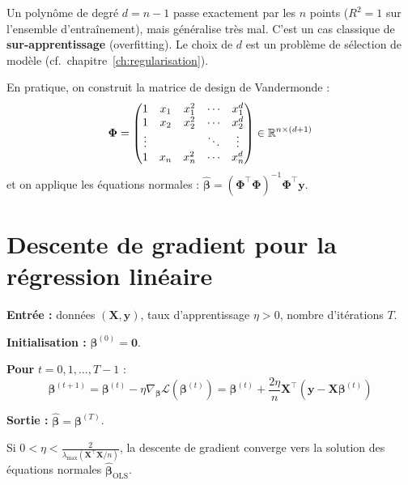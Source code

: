\begin{attention}[title=\textbf{Sur-apprentissage polynomial}]
Un polyn\^ome de degr\'e $d = n - 1$ passe exactement par les $n$ points
($R^2 = 1$ sur l'ensemble d'entra\^inement), mais g\'en\'eralise tr\`es mal.
C'est un cas classique de \textbf{sur-apprentissage} (overfitting). Le choix de $d$
est un probl\`eme de s\'election de mod\`ele (cf.\ chapitre~\ref{ch:regularisation}).
\end{attention}

\begin{remarque}
En pratique, on construit la matrice de design de Vandermonde :
\[
  \bm{\Phi} = \begin{pmatrix}
    1 & x_1 & x_1^2 & \cdots & x_1^d \\
    1 & x_2 & x_2^2 & \cdots & x_2^d \\
    \vdots & & & \ddots & \vdots \\
    1 & x_n & x_n^2 & \cdots & x_n^d
  \end{pmatrix} \in \mathbb{R}^{n \times (d+1)}
\]
et on applique les \'equations normales : $\hat{\bm{\beta}} = (\bm{\Phi}^\top \bm{\Phi})^{-1}\bm{\Phi}^\top \bm{y}$.
\end{remarque}

\section{Descente de gradient pour la r\'egression lin\'eaire}
\label{sec:gradient-descent}

\begin{algorithme}[title=\textbf{Descente de gradient (batch)}]
\textbf{Entr\'ee :} donn\'ees $(\bm{X}, \bm{y})$, taux d'apprentissage $\eta > 0$,
nombre d'it\'erations $T$.

\textbf{Initialisation :} $\bm{\beta}^{(0)} = \bm{0}$.

\textbf{Pour} $t = 0, 1, \ldots, T-1$ :
\[
  \bm{\beta}^{(t+1)} = \bm{\beta}^{(t)} - \eta \nabla_{\bm{\beta}} \mathcal{L}(\bm{\beta}^{(t)})
  = \bm{\beta}^{(t)} + \frac{2\eta}{n} \bm{X}^\top (\bm{y} - \bm{X}\bm{\beta}^{(t)})
\]

\textbf{Sortie :} $\hat{\bm{\beta}} = \bm{\beta}^{(T)}$.
\end{algorithme}

\begin{proposition}[Convergence]
Si $0 < \eta < \frac{2}{\lambda_{\max}(\bm{X}^\top \bm{X} / n)}$, la descente de gradient
converge vers la solution des \'equations normales $\hat{\bm{\beta}}_{\text{OLS}}$.
\end{proposition}

